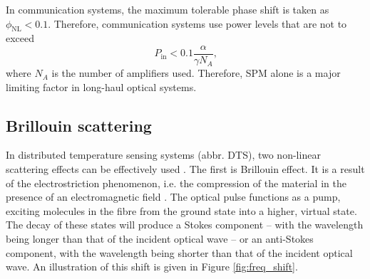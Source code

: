 \documentclass{standalone}
\begin{document}
In communication systems, the maximum tolerable phase shift is taken as $\phi_\textrm{NL} < 0.1$. Therefore, communication systems use power levels that are not to exceed
\begin{equation}
P_\textrm{in} < 0.1 \frac{\alpha}{\gamma N_A} \textrm{,}
\end{equation}
where $N_A$ is the number of amplifiers used. Therefore, SPM alone is a major limiting factor in long-haul optical systems.


\subsection{Brillouin scattering}

In distributed temperature sensing systems (abbr. DTS), two non-linear scattering effects can be effectively used \cite{epflBookInelastic}. The first is Brillouin effect. It is a result of the electrostriction phenomenon, i.e. the compression of the material in the presence of an electromagnetic field \cite{agrawalNonlinear}. The optical pulse functions as a pump, exciting molecules in the fibre from the ground state into a higher, virtual state. The decay of these states will produce a Stokes component -- with the wavelength being longer than that of the incident optical wave -- or an anti-Stokes component, with the wavelength being shorter than that of the incident optical wave. An illustration of this shift is given in Figure \ref{fig:freq_shift}.
\end{document}
